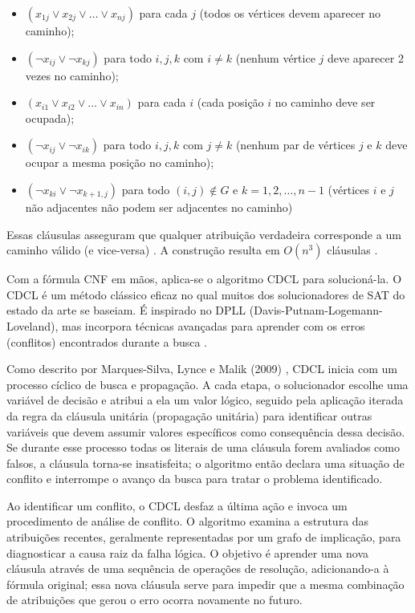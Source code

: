\begin{itemize}
    \item $(x_{1j}\lor x_{2j}\lor\ldots\lor x_{nj})$ para cada $j$ (todos os vértices devem aparecer no caminho);
    \item $(\lnot x_{ij}\lor\lnot x_{kj})$ para todo $i,j,k$ com $i\ne k$ (nenhum vértice $j$ deve aparecer 2 vezes no caminho);
    \item $(x_{i1}\lor x_{i2}\lor\ldots\lor x_{in})$ para cada $i$ (cada posição $i$ no caminho deve ser ocupada);
    \item $(\lnot x_{ij}\lor\lnot x_{ik})$ para todo $i,j,k$ com $j\ne k$ (nenhum par de vértices $j$ e $k$ deve ocupar a mesma posição no caminho);
    \item $(\lnot x_{ki}\lor\lnot x_{k+1,j})$ para todo $(i,j)\not\in G$ e $k=1,2,\ldots,n-1$ (vértices $i$ e $j$ não adjacentes não podem ser adjacentes no caminho)
\end{itemize}

\noindent Essas cláusulas asseguram que qualquer atribuição verdadeira corresponde a um caminho válido (e vice-versa) \cite{Lyuu2022}. A construção resulta em $O(n^3)$ cláusulas \cite{Lyuu2022}.

Com a fórmula CNF em mãos, aplica-se o algoritmo CDCL \cite{MarquesSilva1996,Bayardo1997} para solucioná-la. O CDCL é um método clássico eficaz no qual muitos dos solucionadores de SAT do estado da arte se baseiam. É inspirado no DPLL (Davis-Putnam-Logemann-Loveland), mas incorpora técnicas avançadas para aprender com os erros (conflitos) encontrados durante a busca \cite{MarquesSilva2009}.

Como descrito por Marques-Silva, Lynce e Malik (2009) \cite{MarquesSilva2009}, CDCL inicia com um processo cíclico de busca e propagação. A cada etapa, o solucionador escolhe uma variável de decisão e atribui a ela um valor lógico, seguido pela aplicação iterada da regra da cláusula unitária (propagação unitária) para identificar outras variáveis que devem assumir valores específicos como consequência dessa decisão. Se durante esse processo todas os literais de uma cláusula forem avaliados como falsos, a cláusula torna-se insatisfeita; o algoritmo então declara uma situação de conflito e interrompe o avanço da busca para tratar o problema identificado.

Ao identificar um conflito, o CDCL desfaz a última ação e invoca um procedimento de análise de conflito. O algoritmo examina a estrutura das atribuições recentes, geralmente representadas por um grafo de implicação, para diagnosticar a causa raiz da falha lógica. O objetivo é aprender uma nova cláusula através de uma sequência de operações de resolução, adicionando-a à fórmula original; essa nova cláusula serve para impedir que a mesma combinação de atribuições que gerou o erro ocorra novamente no futuro.

